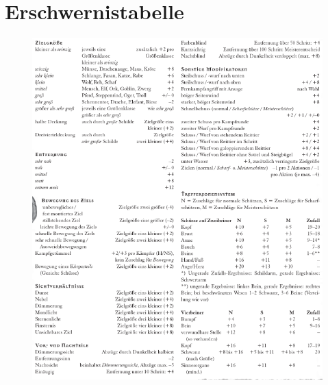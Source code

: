 \section{Erschwernistabelle}
\begin{figure}[H]
    \centering
    \includegraphics[width=.9\linewidth]{Kampf/Angriff/erschwernisse.png}
\end{figure}